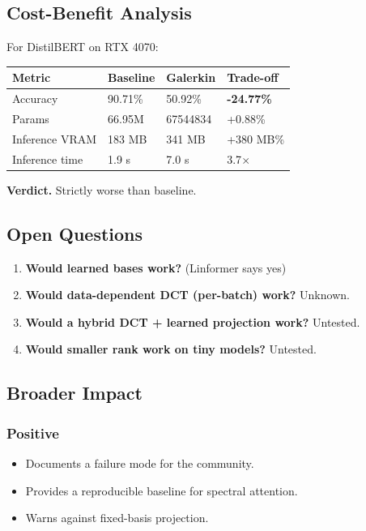\subsection{Cost-Benefit Analysis}

For DistilBERT on RTX 4070:

\begin{table}[H]
\centering
\small
\begin{tabular}{llll}
\toprule
\textbf{Metric} & \textbf{Baseline} & \textbf{Galerkin} & \textbf{Trade-off} \\
\midrule
Accuracy & 90.71\% & 50.92\% & \textbf{-24.77\%} \\
Params & 66.95M & 67544834 & +0.88\% \\
Inference VRAM & 183 MB & 341 MB & +380 MB\% \\
Inference time & 1.9 s & 7.0 s & 3.7$\times$ \\
\bottomrule
\end{tabular}
\end{table}

\textbf{Verdict.} Strictly worse than baseline.

\subsection{Open Questions}

\begin{enumerate}
\item \textbf{Would learned bases work?} (Linformer says yes)
\item \textbf{Would data-dependent DCT (per-batch) work?} Unknown.
\item \textbf{Would a hybrid DCT + learned projection work?} Untested.
\item \textbf{Would smaller rank work on tiny models?} Untested.

\end{enumerate}
\subsection{Broader Impact}

\subsubsection{Positive}

\begin{itemize}
\item Documents a failure mode for the community.
\item Provides a reproducible baseline for spectral attention.
\item Warns against fixed-basis projection.

\end{itemize}
